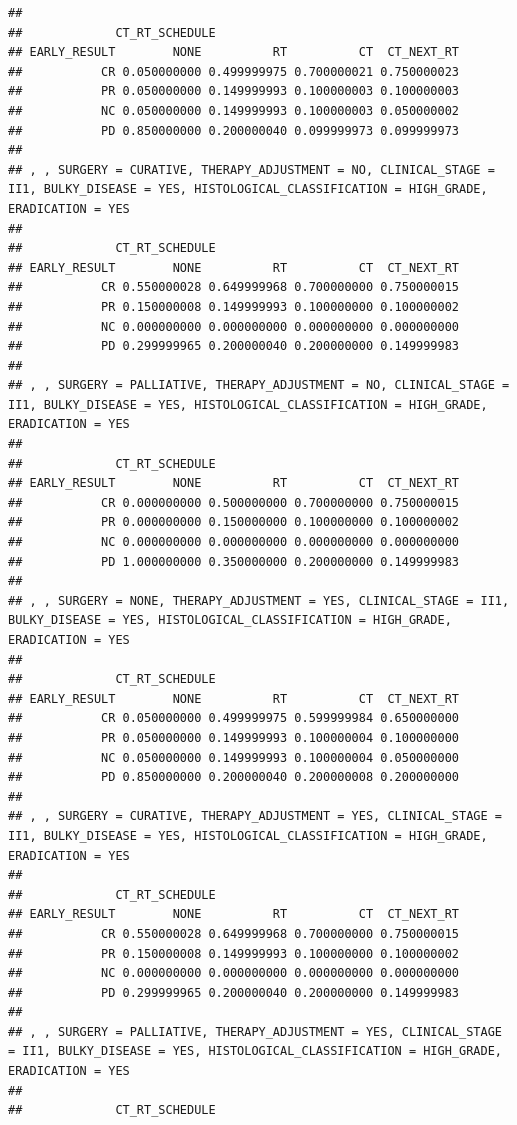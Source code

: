 \documentclass[]{article}
\begin{document}
\begin{verbatim}
## 
##             CT_RT_SCHEDULE
## EARLY_RESULT        NONE          RT          CT  CT_NEXT_RT
##           CR 0.050000000 0.499999975 0.700000021 0.750000023
##           PR 0.050000000 0.149999993 0.100000003 0.100000003
##           NC 0.050000000 0.149999993 0.100000003 0.050000002
##           PD 0.850000000 0.200000040 0.099999973 0.099999973
## 
## , , SURGERY = CURATIVE, THERAPY_ADJUSTMENT = NO, CLINICAL_STAGE = II1, BULKY_DISEASE = YES, HISTOLOGICAL_CLASSIFICATION = HIGH_GRADE, ERADICATION = YES
## 
##             CT_RT_SCHEDULE
## EARLY_RESULT        NONE          RT          CT  CT_NEXT_RT
##           CR 0.550000028 0.649999968 0.700000000 0.750000015
##           PR 0.150000008 0.149999993 0.100000000 0.100000002
##           NC 0.000000000 0.000000000 0.000000000 0.000000000
##           PD 0.299999965 0.200000040 0.200000000 0.149999983
## 
## , , SURGERY = PALLIATIVE, THERAPY_ADJUSTMENT = NO, CLINICAL_STAGE = II1, BULKY_DISEASE = YES, HISTOLOGICAL_CLASSIFICATION = HIGH_GRADE, ERADICATION = YES
## 
##             CT_RT_SCHEDULE
## EARLY_RESULT        NONE          RT          CT  CT_NEXT_RT
##           CR 0.000000000 0.500000000 0.700000000 0.750000015
##           PR 0.000000000 0.150000000 0.100000000 0.100000002
##           NC 0.000000000 0.000000000 0.000000000 0.000000000
##           PD 1.000000000 0.350000000 0.200000000 0.149999983
## 
## , , SURGERY = NONE, THERAPY_ADJUSTMENT = YES, CLINICAL_STAGE = II1, BULKY_DISEASE = YES, HISTOLOGICAL_CLASSIFICATION = HIGH_GRADE, ERADICATION = YES
## 
##             CT_RT_SCHEDULE
## EARLY_RESULT        NONE          RT          CT  CT_NEXT_RT
##           CR 0.050000000 0.499999975 0.599999984 0.650000000
##           PR 0.050000000 0.149999993 0.100000004 0.100000000
##           NC 0.050000000 0.149999993 0.100000004 0.050000000
##           PD 0.850000000 0.200000040 0.200000008 0.200000000
## 
## , , SURGERY = CURATIVE, THERAPY_ADJUSTMENT = YES, CLINICAL_STAGE = II1, BULKY_DISEASE = YES, HISTOLOGICAL_CLASSIFICATION = HIGH_GRADE, ERADICATION = YES
## 
##             CT_RT_SCHEDULE
## EARLY_RESULT        NONE          RT          CT  CT_NEXT_RT
##           CR 0.550000028 0.649999968 0.700000000 0.750000015
##           PR 0.150000008 0.149999993 0.100000000 0.100000002
##           NC 0.000000000 0.000000000 0.000000000 0.000000000
##           PD 0.299999965 0.200000040 0.200000000 0.149999983
## 
## , , SURGERY = PALLIATIVE, THERAPY_ADJUSTMENT = YES, CLINICAL_STAGE = II1, BULKY_DISEASE = YES, HISTOLOGICAL_CLASSIFICATION = HIGH_GRADE, ERADICATION = YES
## 
##             CT_RT_SCHEDULE

\end{verbatim}
\end{document}
